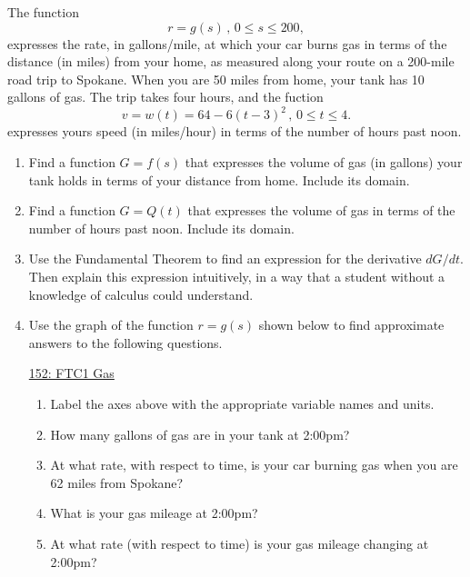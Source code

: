 \documentclass{ximera}
\begin{document}
\begin{question} \label{QoODROOOD}

The function
\[
 r =g(s) \, , \, 0\leq s \leq 200 ,
\]
 expresses the rate, in gallons/mile, at which your car burns gas in terms of the distance (in miles) from your home, as measured along your route on a 200-mile road trip to Spokane. When you are 50 miles from home, your tank has 10 gallons of gas. The trip takes four hours, and the fuction
\[
 v =w(t) = 64 - 6(t-3)^2 \, , \, 0 \leq t \leq 4. 
 \]
expresses yours speed (in miles/hour) in terms of the number of hours past noon.

\begin{enumerate}

\item Find a function $G = f(s)$ that expresses the volume of gas (in gallons) your tank holds in terms of your distance from home. Include its domain.

\item Find a function $G = Q(t)$ that expresses the volume of gas in terms of the number of hours past noon. Include its
 domain.

\item Use the Fundamental Theorem to find an expression for the derivative $dG/dt$. Then explain this expression intuitively, in a way that a student without a knowledge of calculus could understand.

\item Use the graph of the function $r = g(s)$ shown below to find approximate answers to the following questions.

\begin{onlineOnly}
    \begin{center}
\end{center}
\end{onlineOnly}

\href{https://www.desmos.com/calculator/tzmqpsznou}{152: FTC1 Gas}


\begin{enumerate}
\item Label the axes above with the appropriate variable names and units.

\item How many gallons of gas are in your tank at 2:00pm?

\item At what rate, with respect to time, is your car burning gas when you are 62 miles from Spokane?

\item What is your gas mileage at 2:00pm? 

\item At what rate (with respect to time) is your gas mileage changing at 2:00pm?
\end{enumerate}
\end{enumerate}
\end{question}
\end{document}
